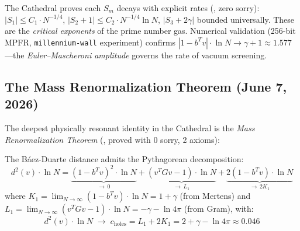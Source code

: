 \documentclass[11pt,a4paper]{article}
\begin{document}
The Cathedral proves each $S_m$ decays with explicit rates
(, zero sorry):
$|S_1| \leq C_1 \cdot N^{-1/4}$,
$|S_2 + 1| \leq C_2 \cdot N^{-1/4} \ln N$,
$|S_3 + 2\gamma|$ bounded universally.
These are the \emph{critical exponents} of the prime number gas.
Numerical validation (256-bit MPFR, \texttt{millennium-wall} experiment)
confirms $|1 - b^T v| \cdot \ln N \to \gamma + 1 \approx 1.577$---the
\emph{Euler--Mascheroni amplitude} governs the rate of vacuum screening.

\subsection{The Mass Renormalization Theorem (June 7, 2026)}
\label{sec:mass-renormalization}

The deepest physically resonant identity in the Cathedral is the
\emph{Mass Renormalization Theorem}
(, proved with 0 sorry, 2 axioms):

\begin{theorem}
\label{thm:mass-renorm}
The B\'aez-Duarte distance admits the Pythagorean decomposition:
\begin{equation}
  d^2(v) \cdot \ln N = \underbrace{(1 - b^T v)^2 \cdot \ln N}_{\to\, 0}
  + \underbrace{(v^T G v - 1) \cdot \ln N}_{\to\, L_1}
  + \underbrace{2(1 - b^T v) \cdot \ln N}_{\to\, 2K_1}
  \label{eq:mass-renorm}
\end{equation}
where $K_1 = \lim_{N \to \infty} (1 - b^T v) \cdot \ln N = 1 + \gamma$
(from Mertens) and $L_1 = \lim_{N \to \infty} (v^T G v - 1) \cdot \ln N
= -\gamma - \ln 4\pi$ (from Gram), with:
\[
  d^2(v) \cdot \ln N \;\to\; c_{\mathrm{holes}}
  = L_1 + 2K_1
  = 2 + \gamma - \ln 4\pi \approx 0.046
\]
\end{theorem}
\end{document}
